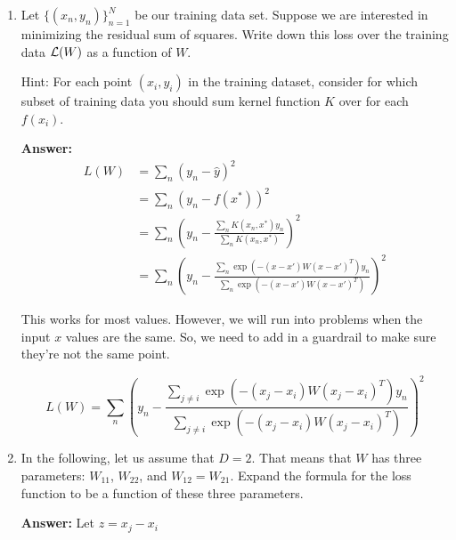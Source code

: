 \documentclass[submit]{harvardml}
\begin{document}
\begin{enumerate}

\item Let $\{(x_n,y_n)\}_{n=1}^N$ be our training data set.  Suppose
  we are interested in minimizing the residual sum of squares.  Write down this
  loss over the training data $\mathcal{L}(W)$ as a function of $W$.
  
  Hint:  For each point $(x_i, y_i)$ in the training dataset, consider for which subset of training data you should sum kernel function $K$ over for each $f(x_i)$.
  
  \textbf{Answer:} 
  \begin{equation}
  \begin{split}
        L(W) &= \sum_{n} (y_n - \hat{y} )^2 \\
        &= \sum_{n} (y_n - f(x^*) )^2 \\
        &= \sum_{n} (y_n - \frac{ \sum_{n} K(x_n,x^*) y_n  }{ \sum_{n} K(x_n,x^*) } )^2\\
        &= \sum_{n} (y_n - \frac{ \sum_{n} \exp(-(x-x') W (x-x')^T ) y_n  }{ \sum_{n} \exp(-(x-x') W (x-x')^T ) } )^2
  \end{split}
  \end{equation}
  
  This works for most values. However, we will run into problems when the input $x$ values are the same. So, we need to add in a guardrail to make sure they're not the same point.
  
  \begin{equation}
      L(W)= \sum_{n} (y_n - \frac{ \sum_{j\neq i} \exp(-(x_j-x_i) W (x_j-x_i)^T ) y_n  }{ \sum_{j\neq i} \exp(-(x_j-x_i) W (x_j-x_i)^T ) } )^2
  \end{equation}

\item In the following, let us assume that $D = 2$.  That means that
  $W$ has three parameters: $W_{11}$, $W_{22}$, and $W_{12} = W_{21}$.
  Expand the formula for the loss function to be a function of these
  three parameters.

\textbf{Answer:}
Let $z = x_j-x_i$ 


\end{enumerate}
\end{document}
